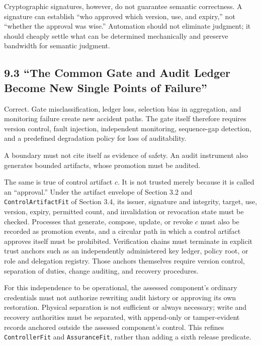 Cryptographic signatures, however, do not guarantee semantic correctness. A signature can establish ``who approved which version, use, and expiry,'' not ``whether the approval was wise.'' Automation should not eliminate judgment; it should cheaply settle what can be determined mechanically and preserve bandwidth for semantic judgment.

\subsection{9.3 ``The Common Gate and Audit Ledger Become New Single Points of Failure''}\label{the-common-gate-and-audit-ledger-become-new-single-points-of-failure}

Correct. Gate misclassification, ledger loss, selection bias in aggregation, and monitoring failure create new accident paths. The gate itself therefore requires version control, fault injection, independent monitoring, sequence-gap detection, and a predefined degradation policy for loss of auditability.

A boundary must not cite itself as evidence of safety. An audit instrument also generates bounded artifacts, whose promotion must be audited.

The same is true of control artifact \(c\). It is not trusted merely because it is called an ``approval.'' Under the artifact envelope of Section 3.2 and \passthrough{\lstinline!ControlArtifactFit!} of Section 3.4, its issuer, signature and integrity, target, use, version, expiry, permitted count, and invalidation or revocation state must be checked. Processes that generate, compose, update, or revoke \(c\) must also be recorded as promotion events, and a circular path in which a control artifact approves itself must be prohibited. Verification chains must terminate in explicit trust anchors such as an independently administered key ledger, policy root, or role and delegation registry. Those anchors themselves require version control, separation of duties, change auditing, and recovery procedures.

For this independence to be operational, the assessed component's ordinary credentials must not authorize rewriting audit history or approving its own restoration. Physical separation is not sufficient or always necessary; write and recovery authorities must be separated, with append-only or tamper-evident records anchored outside the assessed component's control. This refines \passthrough{\lstinline!ControllerFit!} and \passthrough{\lstinline!AssuranceFit!}, rather than adding a sixth release predicate.

